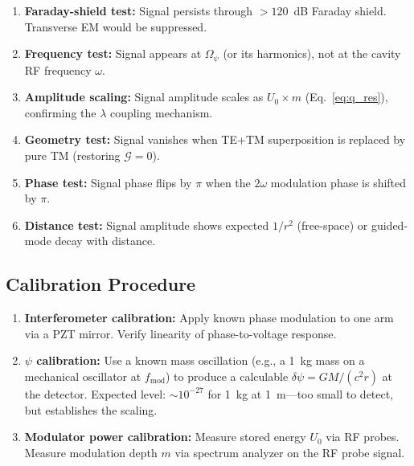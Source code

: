 \documentclass[11pt,letterpaper]{article}
\newcommand{\psifield}{\psi}
\begin{document}
\begin{enumerate}
\item \textbf{Faraday-shield test:} Signal persists through
$>120$~dB Faraday shield. Transverse EM would be suppressed.

\item \textbf{Frequency test:} Signal appears at $\Omega_\psi$
(or its harmonics), not at the cavity RF frequency $\omega$.

\item \textbf{Amplitude scaling:} Signal amplitude scales as
$U_0 \times m$ (Eq.~\ref{eq:q_res}), confirming the $\lambda$
coupling mechanism.

\item \textbf{Geometry test:} Signal vanishes when TE+TM
superposition is replaced by pure TM (restoring
$\mathcal{G} = 0$).

\item \textbf{Phase test:} Signal phase flips by $\pi$ when the
$2\omega$ modulation phase is shifted by $\pi$.

\item \textbf{Distance test:} Signal amplitude shows expected
$1/r^2$ (free-space) or guided-mode decay with distance.
\end{enumerate}

\subsection{Calibration Procedure}

\begin{enumerate}
\item \textbf{Interferometer calibration:} Apply known phase
modulation to one arm via a PZT mirror. Verify linearity of
phase-to-voltage response.

\item \textbf{$\psifield$ calibration:} Use a known mass
oscillation (e.g., a 1~kg mass on a mechanical oscillator at
$f_\text{mod}$) to produce a calculable
$\delta\psifield = GM/(c^2 r)$ at the detector. Expected level:
$\sim 10^{-27}$ for 1~kg at 1~m---too small to detect, but
establishes the scaling.

\item \textbf{Modulator power calibration:} Measure stored energy
$U_0$ via RF probes. Measure modulation depth $m$ via
spectrum analyzer on the RF probe signal.
\end{enumerate}

\end{document}
